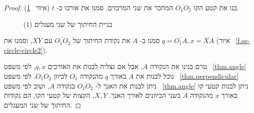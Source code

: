 \begin{proof}
בנו את קטע הקו
$\overline{O_1O_2}$
המחבר את שני המרכזים. סמנו את אורכו ב-%
$t$
(איור%
~\ref{f.se-circle-circle1}).


\begin{figure}[htb]
\begin{center}
\end{center}
\caption{בניית החיתוך של שני מעגלים (1)}\label{f.se-circle-circle1}
\end{figure}

%
סמנו ב-%
$A$
את נקודת החיתוך של
$\overline{O_1O_2}$
עם
$\overline{XY}$,
וסמנו את
$q=\overline{O_1A},x=\overline{XA}$
(איור%
~\ref{f.se-circle-circle2}).

טרם בנינו את הנקודה
$A$,
אבל אם נצליח לבנות את האורכים
$q,x$,
לפי משפט~%
\ref{thm.angle}
נוכל לבנות את 
$A$
באורך
$q$
מהנקודה
$O_1$
לכיוון
$\overline{O_1O_2}$.
לפי משפט~%
\ref{thm.perpendicular}
ניתן לבנות את האנך ל-%
$\overline{O_1O_2}$
בנקודה
$A$,
ושוב לפי משפט~%
\ref{thm.angle}
ניתן לבנות קטעי קו באורך
$x$
מהנקודה
$A$
בשני הכיוונים לאורך האנך.
$X,Y$,
הקצות של קטעי הקו, הם נקודות החיתוך של שני המעגלים.


\end{proof}
